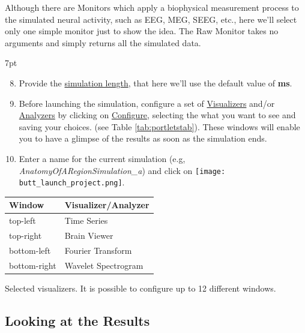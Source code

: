\documentclass{tufte-handout}
\newenvironment{simulation}{%
  \def\FrameCommand{%
    \hspace{1pt}%
    {\color{ForestGreen}\vrule width 2pt}%
    {\color{simulationshade}\vrule width 4pt}%
    \colorbox{simulationshade}%
  }%
  \MakeFramed{\advance\hsize-\width\FrameRestore}%
  \noindent\hspace{-4.55pt}%
  \begin{adjustwidth}{}{7pt}%
  \vspace{2pt}\vspace{2pt}%
}
{%
  \vspace{2pt}\end{adjustwidth}\endMakeFramed%
}
\begin{document}
Although there are Monitors which apply a biophysical measurement process to
the simulated neural activity, such as EEG, MEG, SEEG, etc.,  here we'll select only
one simple monitor just to show the idea. The Raw Monitor takes no arguments
and simply returns all the simulated data. 


\begin{simulation}
\begin{enumerate}[resume]
  \setcounter{enumi}{7}
 \item Provide the \underline{simulation length}, that here we'll use the default value of \textbf{\unit[1000]{ms}}.
 \item Before launching the simulation, configure a set of \underline{Visualizers} and/or \underline{Analyzers} by clicking on \underline{Configure}, selecting the what you want to see and saving your choices. (see Table \ref{tab:portletstab}). These windows will enable you to have a glimpse of the results as soon as the simulation ends. 
 \item Enter a name for the current simulation (e.g, \textit{AnatomyOfARegionSimulation\_a}) and click on  \texttt{[image: butt\_launch\_project.png]}.
\end{enumerate}
\end{simulation}

\begin{margintable}
  \centering
  \selectfont
  \begin{tabular}{ll}
    \toprule
    Window & Visualizer/Analyzer \\
    \midrule
             top-left          &   Time Series   \\
             top-right        &   Brain Viewer\\
             bottom-left    &   Fourier Transform        \\
             bottom-right  &   Wavelet Spectrogram \\
    \bottomrule
  \end{tabular}
  \caption{Selected visualizers. It is possible to configure up to 12 different windows. }
  \label{tab:portletstab}
\end{margintable}


\subsection{Looking at the Results}\label{sec:results}
\end{document}

